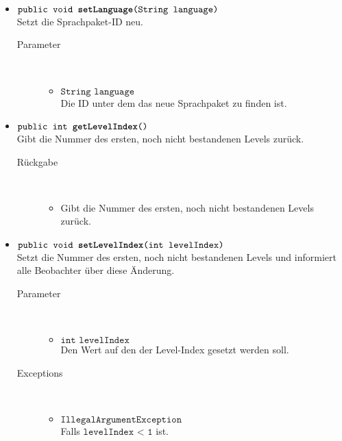 \begin{description}
\begin{itemize}
		\item $\texttt{public void \textbf{setLanguage}(String language)}$ \\ Setzt die Sprachpaket-ID neu.
		\begin{description}
			\item[Parameter] \hfill \\
			\vspace{-.8cm}
			\begin{itemize}
				\item $\texttt{String language}$ \\  Die ID unter dem das neue Sprachpaket zu finden ist.
			\end{itemize}
		\end{description}
		
		\item $\texttt{public int \textbf{getLevelIndex}()}$ \\ Gibt die Nummer des ersten, noch nicht bestandenen Levels zurück.
		\begin{description}
			\item[Rückgabe] \hfill \\
			\vspace{-.8cm}
			\begin{itemize}
				\item Gibt die Nummer des ersten, noch nicht bestandenen Levels zurück.
			\end{itemize}
		\end{description}
		
		\item $\texttt{public void \textbf{setLevelIndex}(int levelIndex)}$ \\ Setzt die Nummer des ersten, noch nicht bestandenen Levels und informiert alle Beobachter über diese Änderung.
		\begin{description}
			\item[Parameter] \hfill \\
			\vspace{-.8cm}
			\begin{itemize}
				\item $\texttt{int levelIndex}$ \\ Den Wert auf den der Level-Index gesetzt werden soll.		
			\end{itemize}
			\item[Exceptions] \hfill \\
			\vspace{-.8cm}
			\begin{itemize}
				\item $\texttt{IllegalArgumentException}$ \\ Falls $\texttt{levelIndex < 1}$ ist.
			\end{itemize}
		\end{description}
		

\end{itemize}
\end{description}
